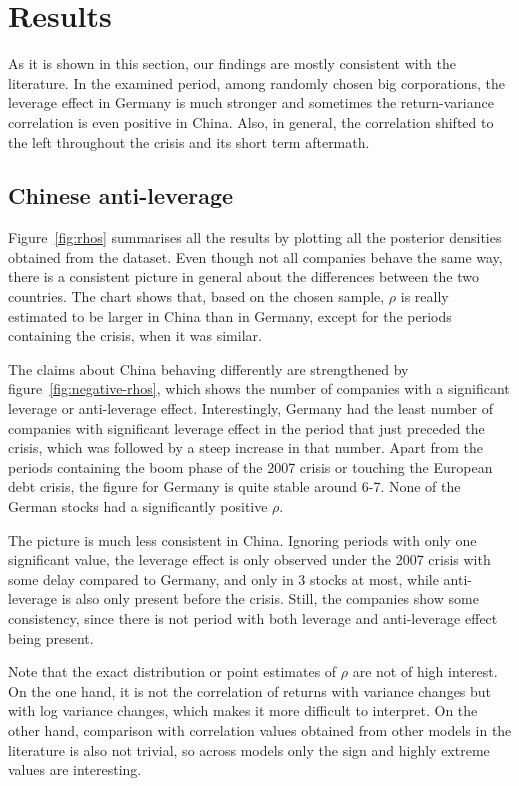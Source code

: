 \section{Results}

As it is shown in this section, our findings are mostly consistent with the literature.
In the examined period, among randomly chosen big corporations, the leverage effect in Germany is much stronger and sometimes the return-variance correlation is even positive in China.
Also, in general, the correlation shifted to the left throughout the crisis and its short term aftermath.

\subsection{Chinese anti-leverage}

Figure~\ref{fig:rhos} summarises all the results by plotting all the posterior densities obtained from the dataset.
Even though not all companies behave the same way, there is a consistent picture in general about the differences between the two countries.
The chart shows that, based on the chosen sample, $\rho$ is really estimated to be larger in China than in Germany, except for the periods containing the crisis, when it was similar.

The claims about China behaving differently are strengthened by figure~\ref{fig:negative-rhos}, which shows the number of companies with a significant leverage or anti-leverage effect.
Interestingly, Germany had the least number of companies with significant leverage effect in the period that just preceded the crisis, which was followed by a steep increase in that number.
Apart from the periods containing the boom phase of the 2007 crisis or touching the European debt crisis, the figure for Germany is quite stable around 6-7.
None of the German stocks had a significantly positive $\rho$.

The picture is much less consistent in China.
Ignoring periods with only one significant value, the leverage effect is only observed under the 2007 crisis with some delay compared to Germany, and only in 3 stocks at most, while anti-leverage is also only present before the crisis.
Still, the companies show some consistency, since there is not period with both leverage and anti-leverage effect being present.

Note that the exact distribution or point estimates of $\rho$ are not of high interest.
On the one hand, it is not the correlation of returns with variance changes but with log variance changes, which makes it more difficult to interpret.
On the other hand, comparison with correlation values obtained from other models in the literature is also not trivial, so across models only the sign and highly extreme values are interesting.

